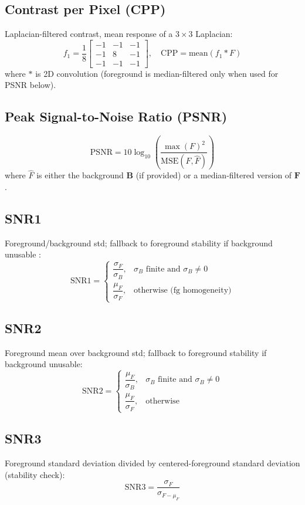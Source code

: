 \documentclass[11pt]{article}
\begin{document}
\subsection{Contrast per Pixel (CPP)}
Laplacian-filtered contrast, mean response of a $3\times3$ Laplacian:
\[
f_1 = \frac{1}{8}
\begin{bmatrix}
-1 & -1 & -1\\
-1 & 8  & -1\\
-1 & -1 & -1
\end{bmatrix}, \quad
\text{CPP} = \text{mean}\left(f_1 * F\right)
\]
where $*$ is 2D convolution (foreground is median-filtered only when used for PSNR below).

\subsection{Peak Signal-to-Noise Ratio (PSNR)}
\[
\text{PSNR} = 10 \log_{10} \left( \frac{\max(F)^2}{\text{MSE}(F,\hat{F})} \right)
\]
where $\hat{F}$ is either the background $\mathbf{B}$ (if provided) or a median-filtered version of $\mathbf{F}$.

\subsection{SNR1}
Foreground/background std; fallback to foreground stability if background unusable \cite{sadri2020mrqy, kushol2023dsmri}:
\[
\text{SNR1} =
\begin{cases}
\dfrac{\sigma_F}{\sigma_B}, & \sigma_B \text{ finite and } \sigma_B \neq 0\\[6pt]
\dfrac{\mu_F}{\sigma_F}, & \text{otherwise (fg homogeneity)}
\end{cases}
\]

\subsection{SNR2}
Foreground mean over background std; fallback to foreground stability if background unusable:
\[
\text{SNR2} =
\begin{cases}
\dfrac{\mu_F}{\sigma_B}, & \sigma_B \text{ finite and } \sigma_B \neq 0\\[6pt]
\dfrac{\mu_F}{\sigma_F}, & \text{otherwise}
\end{cases}
\]

\subsection{SNR3}
Foreground standard deviation divided by centered-foreground standard deviation (stability check):
\[
\text{SNR3} = \frac{\sigma_F}{\sigma_{F - \mu_F}}
\]
\end{document}
